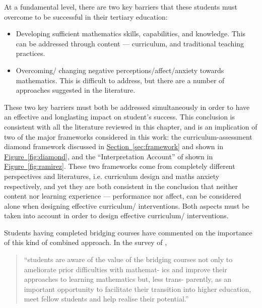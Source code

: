 \documentclass[twoside,12pt,a4paper]{report}
\newcommand{\refsec}[1]{\hyperref[sec:#1]{Section~\ref{sec:#1}}}
\newcommand{\reffig}[1]{\hyperref[fig:#1]{Figure~\ref{fig:#1}}}
\begin{document}
At a fundamental level, there are two key barriers that these students must overcome to be successful in their tertiary education:
\begin{itemize}
	\item Developing sufficient mathematics skills, capabilities, and knowledge. This can be addressed through content --- curriculum, and traditional teaching practices. 
	\item Overcoming/ changing negative perceptions/affect/anxiety towards mathematics. This is difficult to address, but there are a number of approaches suggested in the literature. 
\end{itemize}
These two key barriers must both be addressed simultaneously in order to have an effective and longlasting impact on student's success. This conclusion is consistent with all the literature reviewed in this chapter, and is an implication of two of the major frameworks considered in this work: the curriculum-assessment diamond framework discussed in \refsec{framework} and shown in \reffig{diamond}, and the ``Interpretation Account'' of  shown in \reffig{ramirez}. These two frameworks come from completely different perspectives and literatures, i.e. curriculum design and maths anxiety respectively, and yet they are both consistent in the conclusion that neither content nor learning experience --- performance nor affect, can be considered alone when designing effective curriculum/ interventions. Both aspects must be taken into account in order to design effective curriculum/ interventions.

Students having completed bridging courses have commented on the importance of this kind of combined approach. In the survey of , 
\begin{quote}
``students are aware of the value of the
bridging courses not only to ameliorate prior difficulties with mathemat-
ics and improve their approaches to learning mathematics but, less trans-
parently, as an important opportunity to facilitate their transition into
higher education, meet fellow students and help realise their potential.''
\end{quote}
\end{document}
